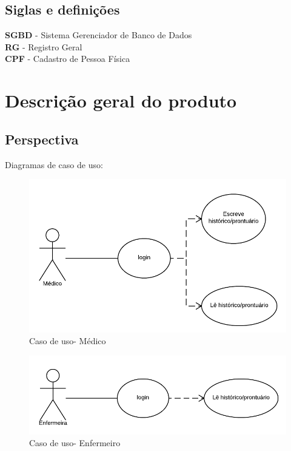 \documentclass[11pt,a4paper]{report}
\begin{document}
\section{Siglas e definições}
\noindent
\textbf{SGBD} - Sistema Gerenciador de Banco de Dados \\
\textbf{RG}   - Registro Geral\\
\textbf{CPF}  - Cadastro de Pessoa Física\\



\chapter*{Descrição geral do produto}

\section{Perspectiva} 

Diagramas de caso de uso:

\begin{figure}[ht!]
  \caption{Caso de uso- Médico}
  \centering
  \includegraphics[scale=.4]{doctor.png}
\end{figure}

\begin{figure}[ht!]
  \caption{Caso de uso- Enfermeiro}
  \centering
  \includegraphics[scale=.4]{nurse.png}
\end{figure}
\end{document}
